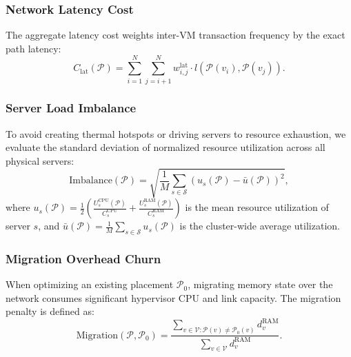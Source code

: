 \documentclass[conference]{IEEEtran}
\begin{document}
\subsubsection{Network Latency Cost}
The aggregate latency cost weights inter-VM transaction frequency by the exact path latency:
\begin{equation}
C_{\mathrm{lat}}(\mathcal{P}) = \sum_{i=1}^{N} \sum_{j=i+1}^{N} w_{i,j}^{\mathrm{lat}} \cdot l\left(\mathcal{P}(v_i), \mathcal{P}(v_j)\right).
\end{equation}

\subsubsection{Server Load Imbalance}
To avoid creating thermal hotspots or driving servers to resource exhaustion, we evaluate the standard deviation of normalized resource utilization across all physical servers:
\begin{equation}
\mathrm{Imbalance}(\mathcal{P}) = \sqrt{\frac{1}{M} \sum_{s \in \mathcal{S}} \left( u_s(\mathcal{P}) - \bar{u}(\mathcal{P}) \right)^2},
\end{equation}
where $u_s(\mathcal{P}) = \frac{1}{2}\left( \frac{U_s^{\mathrm{CPU}}(\mathcal{P})}{C_s^{\mathrm{CPU}}} + \frac{U_s^{\mathrm{RAM}}(\mathcal{P})}{C_s^{\mathrm{RAM}}} \right)$ is the mean resource utilization of server $s$, and $\bar{u}(\mathcal{P}) = \frac{1}{M}\sum_{s \in \mathcal{S}} u_s(\mathcal{P})$ is the cluster-wide average utilization.

\subsubsection{Migration Overhead Churn}
When optimizing an existing placement $\mathcal{P}_0$, migrating memory state over the network consumes significant hypervisor CPU and link capacity. The migration penalty is defined as:
\begin{equation}
\mathrm{Migration}(\mathcal{P}, \mathcal{P}_0) = \frac{\sum_{v \in \mathcal{V} : \mathcal{P}(v) \neq \mathcal{P}_0(v)} d_v^{\mathrm{RAM}}}{\sum_{v \in \mathcal{V}} d_v^{\mathrm{RAM}}}.
\end{equation}
\end{document}
